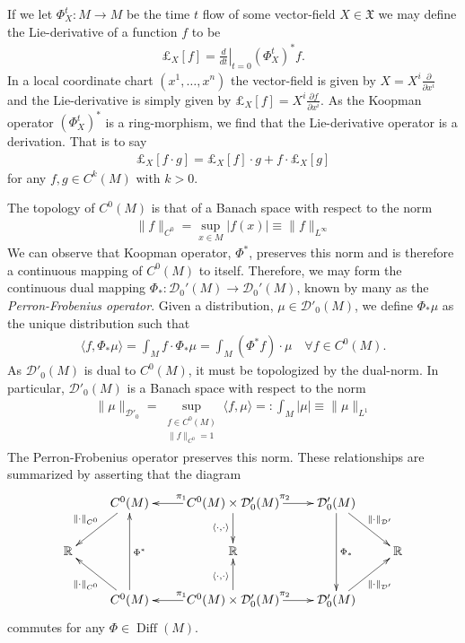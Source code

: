 \documentclass[12pt]{amsart}
\newcommand{\pder}[2]{\ensuremath{\frac{ \partial #1}{\partial #2}}}
\DeclareMathOperator{\Diff}{Diff}
\begin{document}
If we let $\Phi^t_X: M \to M$ be the time $t $ flow of some vector-field $X \in \mathfrak{X}$
we may define the Lie-derivative of a function $f$ to be
\begin{align*}
	\pounds_X[f] = \left. \frac{d}{d t} \right|_{t=0} (\Phi_X^t)^*f.
\end{align*}
In a local coordinate chart $(x^1,\dots,x^n)$ the vector-field is given by $X = X^i \pder{}{x^i}$
and the Lie-derivative is simply given by $\pounds_{X}[f] = X^i \pder{f}{x^i}$.
As the Koopman operator $(\Phi_X^t)^*$ is a ring-morphism, we find that the Lie-derivative operator is a derivation.
That is to say
\begin{align*}
	\pounds_X[ f \cdot g] = \pounds_X[f] \cdot g + f \cdot \pounds_X[g]
\end{align*}
for any $f,g \in C^k(M)$ with $k > 0$.

The topology of $C^0(M)$ is that of a Banach space with respect to the norm
\begin{align*}
	\| f \|_{C^0} = \sup_{x \in M} | f(x) | \equiv \| f \|_{L^\infty}
\end{align*}
We can observe that Koopman operator, $\Phi^*$, preserves this norm and is therefore
a continuous mapping of $C^0(M)$ to itself.
Therefore, we may form the continuous dual mapping $\Phi_*: \mathcal{D}_0'(M) \to \mathcal{D}_0'(M)$,
known by many as the \emph{Perron-Frobenius operator}.
Given a distribution, $\mu \in \mathcal{D}'_0(M)$, we define $\Phi_* \mu$ as the unique distribution such that
\begin{align*}
	\langle f , \Phi_*\mu \rangle = \int_M f \cdot \Phi_* \mu = \int_M (\Phi^*f ) \cdot \mu \quad \forall f \in C^0(M).
\end{align*}
As $\mathcal{D}'_0(M)$ is dual to $C^0(M)$, it must be topologized by the dual-norm.
In particular, $\mathcal{D}'_0(M)$ is a Banach space with respect to the norm
\begin{align*}
	\| \mu \|_{\mathcal{D}'_0} = \sup_{
		\substack{
				f \in C^0(M) \\
				\| f \|_{C^0} = 1
		}
	} \langle f , \mu \rangle =: \int_M | \mu | \equiv \| \mu \|_{L^1}
\end{align*}
The Perron-Frobenius operator preserves this norm.
These relationships are summarized by asserting that the diagram
\begin{equation*}
	\xymatrix{
		& \ar[dl]_{\| \cdot \|_{C^0}} C^0(M) & \ar[l]_{\pi_1} C^0(M)\times \mathcal{D}'_0(M) \ar[d]_{\langle \cdot , \cdot \rangle} \ar[r]^{\pi_2} & \mathcal{D}'_0(M)   \ar[dd]^{\Phi_*} \ar[dr]^{\| \cdot \|_{\mathcal{D}'}}& \\
		\mathbb{R} && \mathbb{R} && \mathbb{R} \\
		& \ar[ul]^{\| \cdot \|_{C^0}} C^0(M) \ar[uu]_{\Phi^*} & \ar[l]_{\pi_1} C^0(M)\times \mathcal{D}'_0(M) \ar[u]^{\langle \cdot , \cdot \rangle} \ar[r]^{\pi_2} & \mathcal{D}'_0(M) \ar[ur]_{\| \cdot \|_{\mathcal{D}'}} &	
	}
\end{equation*}
commutes for any $\Phi \in \Diff(M)$.
\end{document}
